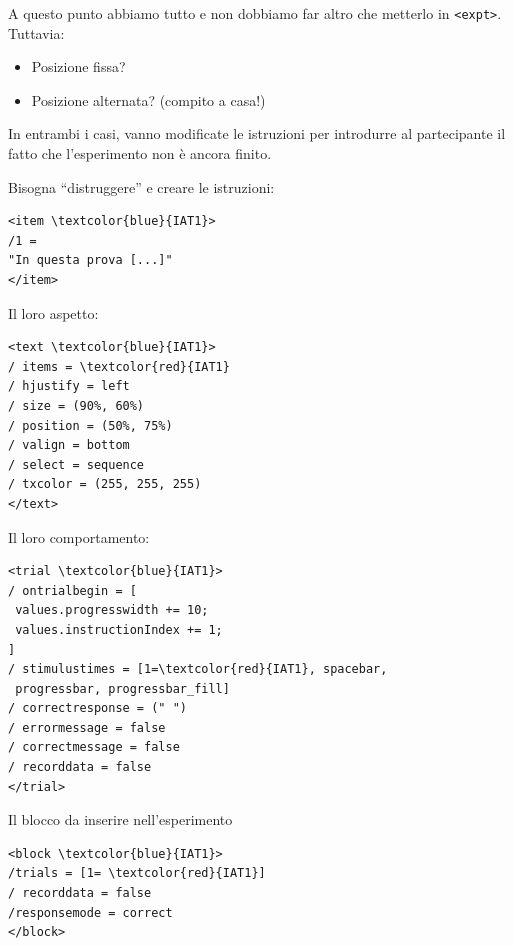 \documentclass{beamer}
\begin{document}
\begin{frame}
	A questo punto abbiamo tutto e non dobbiamo far altro che metterlo in \texttt{<expt>}. Tuttavia: 
	
	\begin{itemize}
		\item Posizione fissa?
		\item Posizione alternata? (compito a casa!)
	\end{itemize}

In entrambi i casi, vanno modificate le istruzioni per introdurre al partecipante il fatto che l'esperimento non è ancora finito. 
\end{frame}


\begin{frame}[fragile]
Bisogna ``distruggere'' e creare le istruzioni: 
\begin{small}
\begin{Verbatim}[commandchars=\\\{\}]
<item \textcolor{blue}{IAT1}>
/1 = 
"In questa prova [...]"
</item>
\end{Verbatim}
Il loro aspetto:
\begin{Verbatim}[commandchars=\\\{\}]
<text \textcolor{blue}{IAT1}>
/ items = \textcolor{red}{IAT1}
/ hjustify = left
/ size = (90%, 60%)
/ position = (50%, 75%)
/ valign = bottom
/ select = sequence
/ txcolor = (255, 255, 255)
</text>
\end{Verbatim}
\end{small}

\end{frame}

\begin{frame}[fragile]
Il loro comportamento:
	\begin{small}
\begin{Verbatim}[commandchars=\\\{\}]
<trial \textcolor{blue}{IAT1}>
/ ontrialbegin = [
 values.progresswidth += 10;
 values.instructionIndex += 1;
]
/ stimulustimes = [1=\textcolor{red}{IAT1}, spacebar, 
 progressbar, progressbar_fill]
/ correctresponse = (" ")
/ errormessage = false
/ correctmessage = false
/ recorddata = false
</trial>
		\end{Verbatim}
	\end{small}
\end{frame}

\begin{frame}[fragile]
Il blocco da inserire nell'esperimento
	\begin{small}
\begin{Verbatim}[commandchars=\\\{\}]
<block \textcolor{blue}{IAT1}>
/trials = [1= \textcolor{red}{IAT1}]
/ recorddata = false
/responsemode = correct
</block>
		\end{Verbatim}
	\end{small}
\end{frame}
\end{document}
